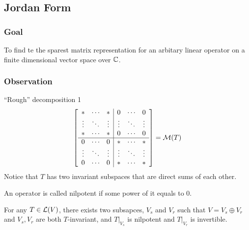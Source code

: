\subsection{Jordan Form}
\subsubsection*{Goal} To find te the sparest matrix representation for an arbitary linear operator on a finite dimensional vector space over $\mathbb C$.
\subsubsection{Observation}
``Rough'' decomposition 1
\[ \left[\begin{array}{ccc|ccc} 
\ast & \cdots & \ast & 0 & \cdots & 0 \\ 
\vdots & \ddots & \vdots & \vdots & \ddots & \vdots \\ 
\ast & \cdots & \ast & 0 & \cdots & 0 \\
\hline
0 & \cdots & 0  & \ast & \cdots & \ast  \\ 
\vdots & \ddots & \vdots & \vdots & \ddots & \vdots\\ 
0 & \cdots & 0 & \ast & \cdots & \ast \\

          \end{array}\right]  = \mathcal M(T)\]
          Notice that $T$ has two invariant subspaces that are direct sums of each other.
\begin{definition}
	An operator is called nilpotent if some power of it equals to $0$.
\end{definition}
\begin{proposition}
	For any $T \in \mathcal L(V)$, there exists two subsapces, $V_s$ and $V_r$ such that $V = V_s \oplus V_r$ and $V_s,V_r$ are both $T$-invariant, and $T\vert_{V_s}$ is nilpotent and $T\vert_{V_r}$ is invertible. 
\end{proposition}

